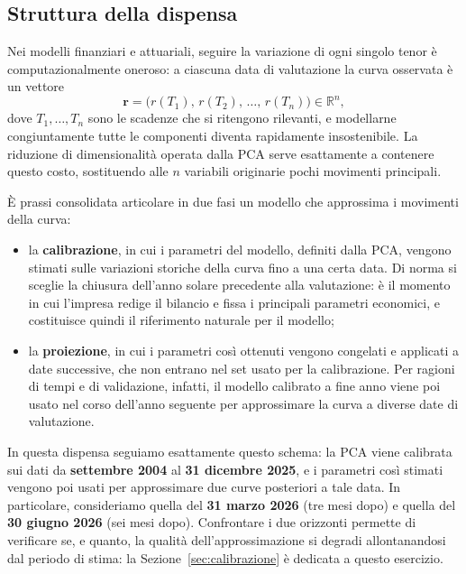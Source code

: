 \documentclass[11pt,a4paper]{article}
\theoremstyle{plain}
\theoremstyle{definition}
\theoremstyle{remark}
\begin{document}


\subsection{Struttura della dispensa}
\label{sec:calibrazione-validazione}

Nei modelli finanziari e attuariali, seguire la variazione di ogni singolo
tenor è computazionalmente oneroso: a ciascuna data di valutazione la curva
osservata è un vettore
\[
  \mathbf{r} = \big(r(T_1),\, r(T_2),\, \ldots,\, r(T_n)\big) \in \mathbb{R}^n,
\]
dove $T_1, \ldots, T_n$ sono le scadenze che si ritengono rilevanti, e
modellarne congiuntamente tutte le componenti diventa rapidamente
insostenibile. La riduzione di dimensionalità operata dalla PCA serve
esattamente a contenere questo costo, sostituendo alle $n$ variabili
originarie pochi movimenti principali.

È prassi consolidata articolare in due fasi un modello che approssima i
movimenti della curva:
\begin{itemize}
  \item la \textbf{calibrazione}, in cui i parametri del modello, definiti dalla PCA, vengono stimati sulle variazioni storiche
        della curva fino a una certa data. Di norma si sceglie la chiusura
        dell'anno solare precedente alla valutazione: è il momento in cui
        l'impresa redige il bilancio e fissa i principali parametri
        economici, e costituisce quindi il riferimento naturale per il
        modello;
  \item la \textbf{proiezione}, in cui i parametri così ottenuti vengono
        congelati e applicati a date successive, che non entrano nel set usato per la calibrazione. 
	Per ragioni di tempi e di validazione, infatti, il
        modello calibrato a fine anno viene poi usato nel corso dell'anno
        seguente per approssimare la curva a diverse date di valutazione.
\end{itemize}

In questa dispensa seguiamo esattamente questo schema: la PCA viene calibrata
sui dati da \textbf{settembre 2004} al \textbf{31 dicembre 2025}, e i parametri così
stimati vengono poi usati per approssimare due curve posteriori a tale data. 
In particolare, consideriamo
quella del \textbf{31 marzo 2026} (tre mesi dopo) e quella del
\textbf{30 giugno 2026} (sei mesi dopo). Confrontare i due orizzonti permette
di verificare se, e quanto, la qualità dell'approssimazione si degradi
allontanandosi dal periodo di stima: la Sezione~\ref{sec:calibrazione} è
dedicata a questo esercizio.
\end{document}
